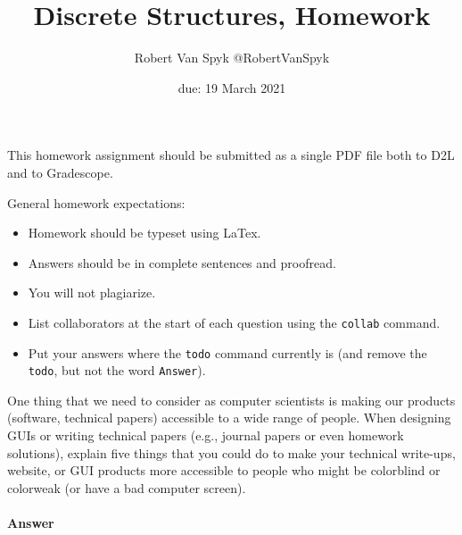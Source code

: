 \documentclass{article}
\title{Discrete Structures, Homework \hwnum}
\author{{Robert Van Spyk} @RobertVanSpyk }
\date{due: 19 March 2021}
\begin{document}
\maketitle

This homework assignment should be
submitted as a single PDF file both to D2L and to Gradescope.

General homework expectations:
\begin{itemize}
    \item Homework should be typeset using LaTex.
    \item Answers should be in complete sentences and proofread.
    \item You will not plagiarize.
    \item List collaborators at the start of each question using the \texttt{collab} command.
    \item Put your answers where the \texttt{todo} command currently is (and
        remove the \texttt{todo}, but not the word \texttt{Answer}).
\end{itemize}


 

One thing that we need to consider as computer scientists is making our products
(software, technical papers) accessible to a wide range of people. When
designing GUIs or writing technical papers (e.g., journal papers or even
homework solutions), explain five things that you could do to make your
technical write-ups, website, or GUI products more accessible to people who
might be colorblind or colorweak (or have a bad computer screen).


\paragraph{Answer}
\end{document}
